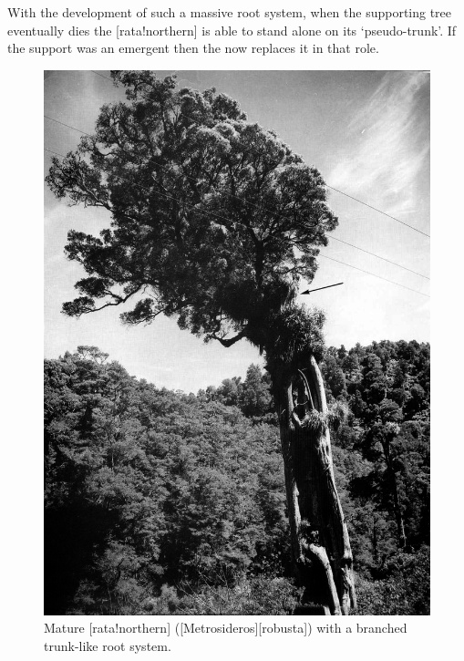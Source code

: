 With the development of such a massive root system, when the supporting tree eventually dies the [rata!northern] is able to stand alone on its `pseudo-trunk'.
If the support was an emergent then the  now replaces it in that role.

\begin{figure}[t]
	\begin{minipage}[t]{\textwidth}
		\begin{minipage}[t]{(\textwidth-\fgap) * \real{0.536}}
			\centering
			\includegraphics[width=\textwidth]{graphics/figure52rata-branched.jpg}
			\caption[Mature northern rata with a branched trunk-like root system]{Mature [rata!northern] ([Metrosideros][robusta]) with a branched trunk-like root system.
}
\end{minipage}
\end{minipage}
\end{figure}
